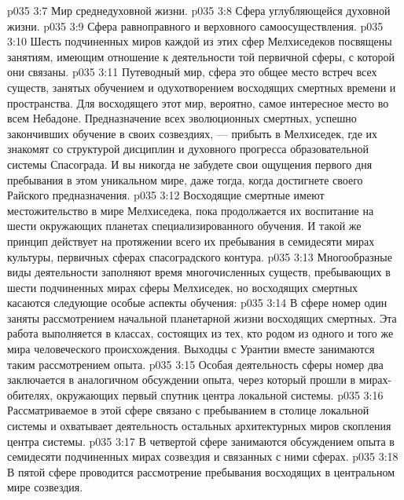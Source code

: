 \vs p035 3:7 \bibnobreakspace Мир среднедуховной жизни.
\vs p035 3:8 \bibnobreakspace Сфера углубляющейся духовной жизни.
\vs p035 3:9 \bibnobreakspace Сфера равноправного и верховного самоосуществления.
\vs p035 3:10 \pc Шесть подчиненных миров каждой из этих сфер Мелхиседеков посвящены занятиям, имеющим отношение к деятельности той первичной сферы, с которой они связаны.
\vs p035 3:11 \pc Путеводный мир, сфера  это общее место встреч всех существ, занятых обучением и одухотворением восходящих смертных времени и пространства. Для восходящего этот мир, вероятно, самое интересное место во всем Небадоне. Предназначение всех эволюционных смертных, успешно закончивших обучение в своих созвездиях, --- прибыть в Мелхиседек, где их знакомят со структурой дисциплин и духовного прогресса образовательной системы Спасограда. И вы никогда не забудете свои ощущения первого дня пребывания в этом уникальном мире, даже тогда, когда достигнете своего Райского предназначения.
\vs p035 3:12 Восходящие смертные имеют местожительство в мире Мелхиседека, пока продолжается их воспитание на шести окружающих планетах специализированного обучения. И такой же принцип действует на протяжении всего их пребывания в семидесяти мирах культуры, первичных сферах спасоградского контура.
\vs p035 3:13 \pc Многообразные виды деятельности заполняют время многочисленных существ, пребывающих в шести подчиненных мирах сферы Мелхиседек, но восходящих смертных касаются следующие особые аспекты обучения:
\vs p035 3:14 \pc {}\bibnobreakspace В сфере номер один заняты рассмотрением начальной планетарной жизни восходящих смертных. Эта работа выполняется в классах, состоящих из тех, кто родом из одного и того же мира человеческого происхождения. Выходцы с Урантии вместе занимаются таким рассмотрением опыта.
\vs p035 3:15 \pc {}\bibnobreakspace Особая деятельность сферы номер два заключается в аналогичном обсуждении опыта, через который прошли в мирах\hyp{}обителях, окружающих первый спутник центра локальной системы.
\vs p035 3:16 \pc {}\bibnobreakspace Рассматриваемое в этой сфере связано с пребыванием в столице локальной системы и охватывает деятельность остальных архитектурных миров скопления центра системы.
\vs p035 3:17 \pc {}\bibnobreakspace В четвертой сфере занимаются обсуждением опыта в семидесяти подчиненных мирах созвездия и связанных с ними сферах.
\vs p035 3:18 \pc {}\bibnobreakspace В пятой сфере проводится рассмотрение пребывания восходящих в центральном мире созвездия.
